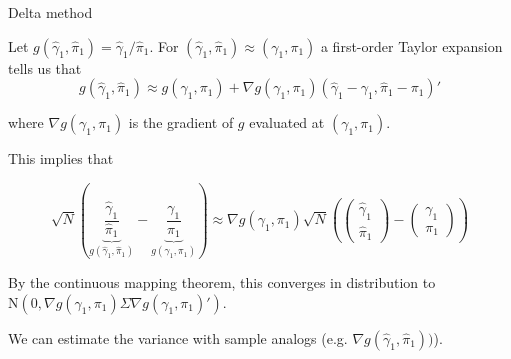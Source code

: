 \documentclass[11pt,english,handout]{beamer}
\newenvironment{wideitemize}{\itemize\addtolength{\itemsep}{10pt}}{\enditemize}
\begin{document}
\begin{frame}{Delta method}
	\begin{wideitemize}
	\item
	Let $g(\hat\gamma_1, \hat\pi_1) = \hat\gamma_1 / \hat\pi_1$. \pause{} For $(\hat\gamma_1, \hat\pi_1) \approx (\gamma_1, \pi_1)$ a first-order Taylor expansion tells us that 
	$$g(\hat\gamma_1, \hat\pi_1) \approx g(\gamma_1,\pi_1) + \nabla g(\gamma_1,\pi_1) (\hat\gamma_1 - \gamma_1, \hat\pi_1 - \pi_1)' $$
	
	\noindent where $\nabla g(\gamma_1,\pi_1)$ is the gradient of $g$ evaluated at $(\gamma_1, \pi_1)$. 
	
	\item
	This implies that
	
	$$\sqrt{N}\left( \underbrace{ \frac{\hat\gamma_1}{\hat\pi_1}}_{g(\hat\gamma_1 , \hat\pi_1)} -  \underbrace{\frac{\gamma_1}{\pi_1} }_{g(\gamma_1,\pi_1)} \right) \approx  \nabla g(\gamma_1, \pi_1)\sqrt{N}\left( \left( \begin{array}{ll} \hat\gamma_1 \\ \hat\pi_1 \end{array} \right)- \left( \begin{array}{ll} \gamma_1 \\ \pi_1 \end{array} \right) \right)  $$
	
	\pause
	\item
	By the continuous mapping theorem, this converges in distribution to $\mathrm{N}(0,  \nabla g(\gamma_1, \pi_1) \Sigma  \nabla g(\gamma_1, \pi_1)')$.
	
	\pause
	\item
	We can estimate the variance with sample analogs (e.g. $\nabla g(\hat\gamma_1, \hat\pi_1))$).
\end{wideitemize}
\end{frame}
\end{document}
